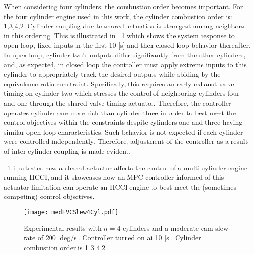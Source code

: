When considering four cylinders, the combustion order becomes important. For the four cylinder engine used in this work, the cylinder combustion order is: 1,3,4,2. Cylinder coupling due to shared actuation is strongest among neighbors in this ordering. This is illustrated in \figurename~\ref{fig:medEVCSlew4Cyl} which shows the system response to open loop, fixed inputs in the first 10 [s] and then closed loop behavior thereafter. In open loop, cylinder two's outputs differ significantly from the other cylinders, and, as expected, in closed loop the controller must apply extreme inputs to this cylinder to appropriately track the desired outputs while abiding by the equivalence ratio constraint. Specifically, this requires an early exhaust valve timing on cylinder two which stresses the control of neighboring cylinders four and one through the shared valve timing actuator. Therefore, the controller operates cylinder one more rich than cylinder three in order to best meet the control objectives within the constraints despite cylinders one and three having similar open loop characteristics. Such behavior is not expected if each cylinder were controlled independently. Therefore, adjustment of the controller as a result of inter-cylinder coupling is made evident.

\figurename~\ref{fig:medEVCSlew4Cyl} illustrates how a shared actuator affects the control of a multi-cylinder engine running HCCI, and it showcases how an MPC controller informed of this actuator limitation can operate an HCCI engine to best meet the (sometimes competing) control objectives.

\begin{figure}
\centering
\texttt{[image: medEVCSlew4Cyl.pdf]}
\caption{Experimental results with $n=4$ cylinders and a moderate cam slew rate of 200 [deg/s]. Controller turned on at 10 [s]. Cylinder combustion order is 1 3 4 2}
\label{fig:medEVCSlew4Cyl}
\end{figure}


